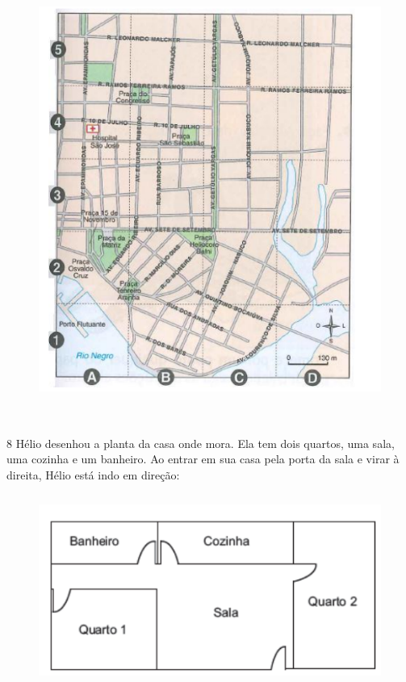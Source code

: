\begin{figure}[h]
\centering\includegraphics[width=5.08333in,height=5.71875in]{./imgSAEB_6_MAT/media/image70.png}
\end{figure}


\num{8}  Hélio desenhou a planta da casa onde mora. Ela tem dois quartos, uma
sala, uma cozinha e um banheiro. Ao entrar em sua casa pela porta da sala e virar à direita, Hélio está
indo em direção:

\begin{figure}[h]
\centering\includegraphics[width=4.94792in,height=2.46875in]{./imgSAEB_6_MAT/media/image71.png}
\end{figure}

